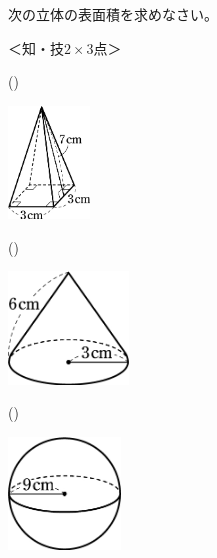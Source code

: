 \documentclass[
  12pt,a4paper,lualatex,ja=standard]{bxjsarticle}
\begin{document}
\begin{flushleft}
\begin{multicols}{3}
\end{multicols}

\vfill

\setcounter{skaunta}{0}
\noindent{} \hspace{1pt}次の立体の表面積を求めなさい。

%
\begin{flushright}%
\footnotesize{＜知・技$2 \times 3$点＞}%
\end{flushright}%


\begin{multicols}{3}

()\hspace{2.5pt}

\begin{center}
\def\@captype{figure}
\includegraphics[height=30mm]{img/img13.jpg}

\end{center}

\columnbreak

()\hspace{2.5pt}

\begin{center}
\def\@captype{figure}
\includegraphics[height=30mm]{img/img11.jpg}

\end{center}

\columnbreak

()\hspace{2.5pt}

\begin{center}
\def\@captype{figure}
\includegraphics[height=30mm]{img/img12.jpg}


\end{center}
\end{multicols}
\end{flushleft}
\end{document}
